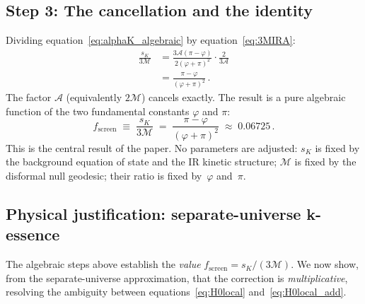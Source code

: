 \documentclass[12pt,a4paper]{article}
\newcommand{\phiG}{\varphi}
\newcommand{\MIRA}{\mathcal{M}}
\newcommand{\AURA}{\mathcal{A}}
\newcommand{\fsc}{f_{\mathrm{screen}}}
\newcommand{\sK}{s_K}          %
\begin{document}
\subsection{Step 3: The cancellation and the identity}
\label{sec:step3}

Dividing equation~\eqref{eq:alphaK_algebraic} by equation~\eqref{eq:3MIRA}:
\begin{align}
  \frac{\sK}{3\MIRA}
  &= \frac{3\AURA(\pi-\phiG)}{2(\phiG+\pi)^2}
     \cdot \frac{2}{3\AURA} \nonumber\\
  &= \frac{\pi-\phiG}{(\phiG+\pi)^2}\,.
  \label{eq:cancellation}
\end{align}
The factor $\AURA$ (equivalently $2\MIRA$) cancels exactly.
The result is a pure algebraic function of the two fundamental constants
$\phiG$ and $\pi$:
\begin{equation}
  \boxed{
    \fsc \;\equiv\; \frac{\sK}{3\MIRA}
         \;=\; \frac{\pi-\phiG}{(\phiG+\pi)^2}
         \;\approx\; 0.06725\,.
  }
  \label{eq:fscreen_identity}
\end{equation}
This is the central result of the paper.
No parameters are adjusted: $\sK$ is fixed by the background equation
of state and the IR kinetic structure; $\MIRA$ is fixed by the disformal
null geodesic; their ratio is fixed by~$\phiG$ and~$\pi$.

\subsection{Physical justification: separate-universe k-essence}
\label{sec:sep_universe}

The algebraic steps above establish the \emph{value} $\fsc = \sK/(3\MIRA)$.
We now show, from the separate-universe approximation, that the correction is \emph{multiplicative},
resolving the ambiguity between equations~\eqref{eq:H0local} and~\eqref{eq:H0local_add}.
\end{document}
